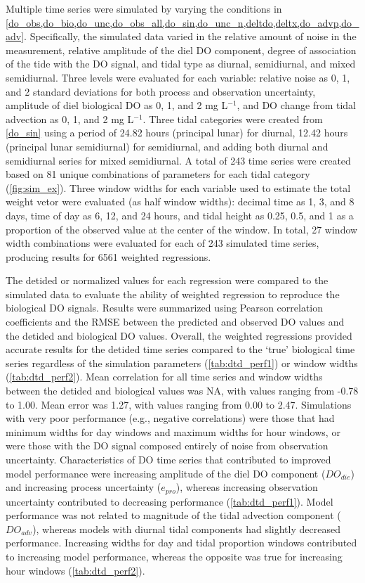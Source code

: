 \documentclass[letterpaper,12pt,oneside]{article}\usepackage[]{graphicx}\usepackage[]{color}
\begin{document}
Multiple time series were simulated by varying the conditions in \cref{do_obs,do_bio,do_unc,do_obs_all,do_sin,do_unc_n,deltdo,deltx,do_advp,do_adv}. Specifically, the simulated data varied in the relative amount of noise in the measurement, relative amplitude of the diel \ac{DO} component, degree of association of the tide with the \ac{DO} signal, and tidal type as diurnal, semidiurnal, and mixed semidiurnal.  Three levels were evaluated for each variable: relative noise as 0, 1, and 2 standard deviations for both process and observation uncertainty, amplitude of diel biological \ac{DO} as 0, 1, and 2 mg L$^{-1}$, and \ac{DO} change from tidal advection as 0, 1, and 2 mg L$^{-1}$.  Three tidal categories were created from \cref{do_sin} using a period of 24.82 hours (principal lunar) for diurnal, 12.42 hours (principal lunar semidiurnal) for semidiurnal, and adding both diurnal and semidiurnal series for mixed semidiurnal. A total of 243 time series were created based on 81 unique combinations of parameters for each tidal category (\cref{fig:sim_ex}).  Three window widths for each variable used to estimate the total weight vetor were evaluated (as half window widths): decimal time as 1, 3, and 8 days, time of day as 6, 12, and 24 hours, and tidal height as 0.25, 0.5, and 1 as a proportion of the observed value at the center of the window.  In total, 27 window width combinations were evaluated for each of 243 simulated time series, producing results for 6561 weighted regressions.

The detided or normalized values for each regression were compared to the simulated data to evaluate the ability of weighted regression to reproduce the biological \ac{DO} signals. Results were summarized using Pearson correlation coefficients and the \ac{RMSE} between the predicted and observed \ac{DO} values and the detided and biological \ac{DO} values.  Overall, the weighted regressions provided accurate results for the detided time series compared to the `true' biological time series regardless of the simulation parameters (\cref{tab:dtd_perf1}) or window widths (\cref{tab:dtd_perf2}).  Mean correlation for all time series and window widths between the detided and biological values was NA, with values ranging from -0.78 to 1.00.  Mean error was 1.27, with values ranging from 0.00 to 2.47.  Simulations with very poor performance (e.g., negative correlations) were those that had minimum widths for day windows and maximum widths for hour windows, or were those with the \ac{DO} signal composed entirely of noise from observation uncertainty. Characteristics of \ac{DO} time series that contributed to improved model performance were increasing amplitude of the diel \ac{DO} component ($DO_{die}$) and increasing process uncertainty ($e_{pro}$), whereas increasing observation uncertainty contributed to decreasing performance (\cref{tab:dtd_perf1}).  Model performance was not related to magnitude of the tidal advection component ($DO_{adv}$), whereas models with diurnal tidal components had slightly decreased performance.  Increasing widths for day and tidal proportion windows contributed to increasing model performance, whereas the opposite was true for increasing hour windows (\cref{tab:dtd_perf2}).
\end{document}
